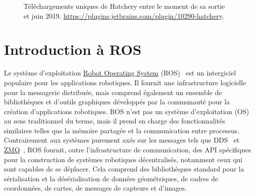 \begin{figure}
    \centering
    \caption{Téléchargements uniques de Hatchery entre le moment de sa sortie et juin 2019. \url{https://plugins.jetbrains.com/plugin/10290-hatchery}.}
    \label{fig:hatchery_downloads}
\end{figure}
%
\section{Introduction à ROS}

Le système d'exploitation \href{https://www.ros.org/}{Robot Operating System} (ROS)~\citep{quigley2009ros} est un intergiciel populaire pour les applications robotiques. Il fournit une infrastructure logicielle pour la messagerie distribuée, mais comprend également un ensemble de bibliothèques et d'outils graphiques développés par la communauté pour la création d'applications robotiques. ROS n'est pas un système d'exploitation (OS) au sens traditionnel du terme, mais il prend en charge des fonctionnalités similaires telles que la mémoire partagée et la communication entre processus. Contrairement aux systèmes purement axés sur les messages tels que DDS~\citep{pardo2003omg} et \href{https://zeromq.org/}{ZMQ}~\citep{hintjens2013zeromq}, ROS fournit, outre l'infrastructure de communication, des API spécifiques pour la construction de systèmes robotiques décentralisés, notamment ceux qui sont capables de se déplacer. Cela comprend des bibliothèques standard pour la sérialisation et la désérialisation de données géométriques, de cadres de coordonnées, de cartes, de messages de capteurs et d'images.

